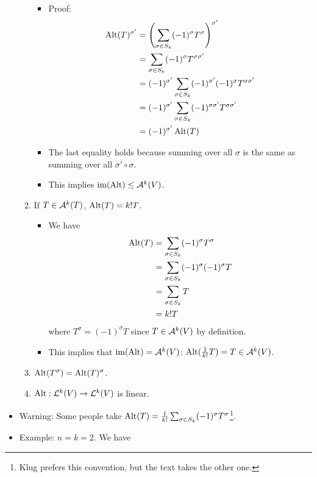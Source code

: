 \documentclass[../notes.tex]{subfiles}
\begin{document}
\begin{itemize}
\begin{enumerate}
\begin{itemize}
            \item Proof:
            \begin{align*}
                \Alt(T)^{\sigma'} &= \left( \sum_{\sigma\in S_k}(-1)^\sigma T^\sigma \right)^{\sigma'}\\
                &= \sum_{\sigma\in S_k}(-1)^\sigma T^{\sigma\sigma'}\\
                &= (-1)^{\sigma'}\sum_{\sigma\in S_k}(-1)^{\sigma'}(-1)^\sigma T^{\sigma\sigma'}\\
                &= (-1)^{\sigma'}\sum_{\sigma\in S_k}(-1)^{\sigma\sigma'}T^{\sigma\sigma'}\\
                &= (-1)^{\sigma'}\Alt(T)
            \end{align*}
            \item The last equality holds because summing over all $\sigma$ is the same as summing over all $\sigma'\circ\sigma$.
            \item This implies $\im(\Alt)\leq\alt[k]{V}$.
        \end{itemize}
        \item If $T\in\alt[k]{T}$, $\Alt(T)=k!T$.
        \begin{itemize}
            \item We have
            \begin{align*}
                \Alt(T) &= \sum_{\sigma\in S_k}(-1)^\sigma T^\sigma\\
                &= \sum_{\sigma\in S_k}(-1)^\sigma(-1)^\sigma T\\
                &= \sum_{\sigma\in S_k}T\\
                &= k!T
            \end{align*}
            where $T^\sigma=(-1)^\sigma T$ since $T\in\alt[k]{V}$ by definition.
            \item This implies that $\im(\Alt)=\alt[k]{V}$: $\Alt(\frac{1}{k!}T)=T\in\alt[k]{V}$.
        \end{itemize}
        \item $\Alt(T^\sigma)=\Alt(T)^\sigma$.
        \item $\Alt:\lin[k]{V}\to\lin[k]{V}$ is linear.
    \end{enumerate}
    \item Warning: Some people take $\Alt(T)=\frac{1}{k!}\sum_{\sigma\in S_k}(-1)^\sigma T^\sigma$\footnote{Klug prefers this convention, but the text takes the other one.}.
    \item Example: $n=k=2$. We have
    \begin{equation*}

\end{equation*}
\end{itemize}
\end{document}
